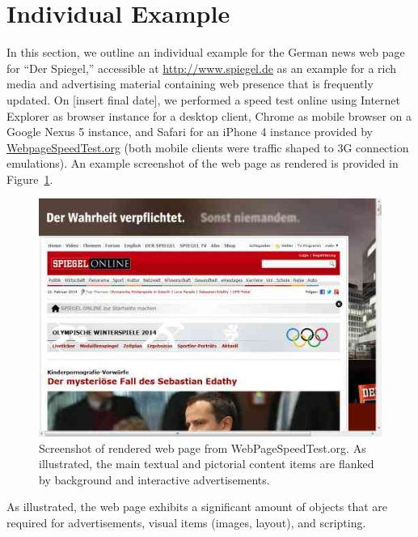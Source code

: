 \documentclass[letterpaper,conference]{IEEEtran}
\begin{document}





\section{Individual Example}
\label{s:example}
In this section, we outline an individual example for the German news web page for ``Der Spiegel,'' accessible at \url{http://www.spiegel.de} as an example for a rich media and advertising material containing web presence that is frequently updated.
On [insert final date], we performed a speed test online using Internet Explorer as browser instance for a desktop client, Chrome as mobile browser on a Google Nexus 5 instance, and Safari for an iPhone 4 instance provided by \url{WebpageSpeedTest.org} (both mobile clients were traffic shaped to 3G connection emulations).
An example screenshot of the web page as rendered is provided in Figure~\ref{fig:screens}.
\begin{figure}
	\centering
	\includegraphics[width=.9\linewidth]{1screen}
	\caption{Screenshot of rendered web page from WebPageSpeedTest.org. As illustrated, the main textual and pictorial content items are flanked by background and interactive advertisements.}
	\label{fig:screens}
\end{figure}
As illustrated, the web page exhibits a significant amount of objects that are required for advertisements, visual items (images, layout), and scripting.
\end{document}

